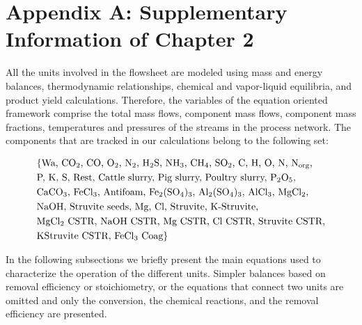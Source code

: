 \chapter{Appendix A: Supplementary Information of Chapter 2}
\begin{refsection}[referencesCh2]
All the units involved in the flowsheet are modeled using mass and energy balances, thermodynamic relationships, chemical and vapor-liquid equilibria, and product yield calculations. Therefore, the variables of the equation oriented framework comprise the total mass flows, component mass flows, component mass fractions, temperatures and pressures of the streams in the process network. The components that are tracked in our calculations belong to the following set:

\begin{align*}
	& \{\text{Wa, CO\textsubscript{2}, CO, O\textsubscript{2}, N\textsubscript{2}, H\textsubscript{2}S, NH\textsubscript{3}, CH\textsubscript{4}, SO\textsubscript{2}, C, H, O, N, N\textsubscript{org},} \\
	& \text{P, K, S, Rest, Cattle slurry, Pig slurry, Poultry slurry, P\textsubscript{2}O\textsubscript{5},} \\
	& \text{CaCO\textsubscript{3}, FeCl\textsubscript{3}, Antifoam,  Fe\textsubscript{2}(SO\textsubscript{4})\textsubscript{3}, Al\textsubscript{2}(SO\textsubscript{4})\textsubscript{3}, AlCl\textsubscript{3}, MgCl\textsubscript{2},} \\
	& \text{NaOH, Struvite seeds, Mg, Cl, Struvite, K-Struvite,} \\
	& \text{MgCl\textsubscript{2} CSTR, NaOH CSTR, Mg CSTR, Cl CSTR, Struvite CSTR,}\\
	&  \text{KStruvite CSTR, FeCl\textsubscript{3} Coag}
	\}
\end{align*}

In the following subsections we briefly present the main equations used to characterize the operation of the different units. Simpler balances based on removal efficiency or stoichiometry, or the equations that connect two units are omitted and only the conversion, the chemical reactions, and the removal efficiency are presented.


\end{refsection}
